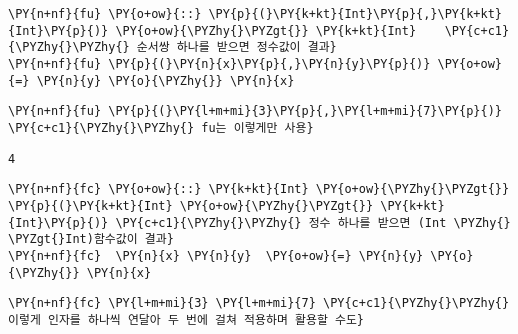     \begin{tcolorbox}[breakable, size=fbox, boxrule=1pt, pad at break*=1mm,colback=cellbackground, colframe=cellborder, top=.75ex]
\begin{Verbatim}[commandchars=\\\{\}]
\PY{n+nf}{fu} \PY{o+ow}{::} \PY{p}{(}\PY{k+kt}{Int}\PY{p}{,}\PY{k+kt}{Int}\PY{p}{)} \PY{o+ow}{\PYZhy{}\PYZgt{}} \PY{k+kt}{Int}    \PY{c+c1}{\PYZhy{}\PYZhy{} 순서쌍 하나를 받으면 정수값이 결과}
\PY{n+nf}{fu} \PY{p}{(}\PY{n}{x}\PY{p}{,}\PY{n}{y}\PY{p}{)} \PY{o+ow}{=} \PY{n}{y} \PY{o}{\PYZhy{}} \PY{n}{x}
\end{Verbatim}
\end{tcolorbox}

    \begin{tcolorbox}[breakable, size=fbox, boxrule=1pt, pad at break*=1mm,colback=cellbackground, colframe=cellborder, top=.75ex]
\begin{Verbatim}[commandchars=\\\{\}]
\PY{n+nf}{fu} \PY{p}{(}\PY{l+m+mi}{3}\PY{p}{,}\PY{l+m+mi}{7}\PY{p}{)} \PY{c+c1}{\PYZhy{}\PYZhy{} fu는 이렇게만 사용}
\end{Verbatim}
\end{tcolorbox}

    
    \begin{Verbatim}[commandchars=\\\{\}]
4
    \end{Verbatim}

    
    \begin{tcolorbox}[breakable, size=fbox, boxrule=1pt, pad at break*=1mm,colback=cellbackground, colframe=cellborder, top=.75ex]
\begin{Verbatim}[commandchars=\\\{\}]
\PY{n+nf}{fc} \PY{o+ow}{::} \PY{k+kt}{Int} \PY{o+ow}{\PYZhy{}\PYZgt{}} \PY{p}{(}\PY{k+kt}{Int} \PY{o+ow}{\PYZhy{}\PYZgt{}} \PY{k+kt}{Int}\PY{p}{)} \PY{c+c1}{\PYZhy{}\PYZhy{} 정수 하나를 받으면 (Int \PYZhy{} \PYZgt{}Int)함수값이 결과}
\PY{n+nf}{fc}  \PY{n}{x} \PY{n}{y}  \PY{o+ow}{=} \PY{n}{y} \PY{o}{\PYZhy{}} \PY{n}{x}
\end{Verbatim}
\end{tcolorbox}

    \begin{tcolorbox}[breakable, size=fbox, boxrule=1pt, pad at break*=1mm,colback=cellbackground, colframe=cellborder, top=.75ex]
\begin{Verbatim}[commandchars=\\\{\}]
\PY{n+nf}{fc} \PY{l+m+mi}{3} \PY{l+m+mi}{7} \PY{c+c1}{\PYZhy{}\PYZhy{} 이렇게 인자를 하나씩 연달아 두 번에 걸쳐 적용하며 활용할 수도}
\end{Verbatim}
\end{tcolorbox}

